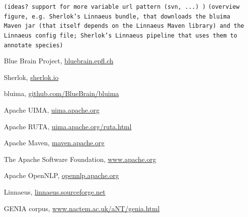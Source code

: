 \documentclass{article}
\newcommand{\TODO}[1]{\texttt{\textcolor{YellowOrange}{(#1)}}} %
\begin{document}
\TODO{ideas? support for more variable url pattern (svn, ...) }
\TODO{overview figure, e.g.  Sherlok's Linnaeus bundle, that downloads the bluima Maven jar (that itself depends on the Linnaeus Maven library) and the Linnaeus config file; Sherlok's Linnaeus pipeline that uses them to annotate species}

\begin{thebibliography}{99}

    Blue Brain Project,
    \href{http://bluebrain.epfl.ch/}{bluebrain.epfl.ch}

    Sherlok,
    \href{http://sherlok.io}{sherlok.io}

    bluima,
    \href{https://github.com/BlueBrain/bluima}{github.com/BlueBrain/bluima}

    Apache UIMA,
    \href{https://uima.apache.org/}{uima.apache.org}

    Apache RUTA,
    \href{https://uima.apache.org/ruta.html}{uima.apache.org/ruta.html}

    Apache Maven,
    \href{https://maven.apache.org/}{maven.apache.org}

    The Apache Software Foundation,
    \href{http://www.apache.org/}{www.apache.org}

    Apache OpenNLP,
    \href{https://opennlp.apache.org/}{opennlp.apache.org}

    Linnaeus,
    \href{http://linnaeus.sourceforge.net/}{linnaeus.sourceforge.net}

    GENIA corpus,
    \href{http://www.nactem.ac.uk/aNT/genia.html}{www.nactem.ac.uk/aNT/genia.html}


\end{thebibliography}

\begin{appendix}
  \listoffigures
  \listoftables
\end{appendix}
\end{document}
